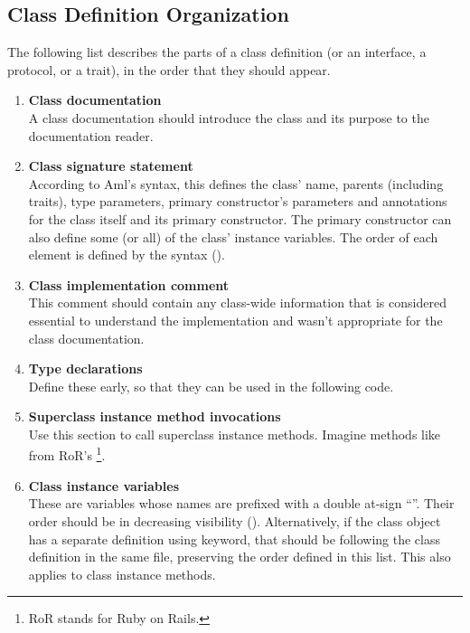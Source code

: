 \subsection{Class Definition Organization}

The following list describes the parts of a class definition (or an interface, a protocol, or a trait), in the order that they should appear. 

\begin{enumerate}
\item {\bfseries Class documentation} \hfill \\
A class documentation should introduce the class and its purpose to the documentation reader. 

\item {\bfseries Class signature statement} \hfill \\
According to Aml's syntax, this defines the class' name, parents (including traits), type parameters, primary constructor's parameters and annotations for the class itself and its primary constructor. The primary constructor can also define some (or all) of the class' instance variables. The order of each element is defined by the syntax (). 

\item {\bfseries Class implementation comment} \hfill \\
This comment should contain any class-wide information that is considered essential to understand the implementation and wasn't appropriate for the class documentation. 

\item {\bfseries Type declarations} \hfill \\
Define these early, so that they can be used in the following code. 

\item {\bfseries Superclass instance method invocations} \hfill \\
Use this section to call superclass instance methods. Imagine methods like  from RoR's \footnote{RoR stands for Ruby on Rails.}. 

\item {\bfseries Class instance variables} \hfill \\
These are variables whose names are prefixed with a double at-sign ``''. Their order should be in decreasing visibility (). Alternatively, if the class object has a separate definition using  keyword, that should be following the class definition in the same file, preserving the order defined in this list. This also applies to class instance methods. 


\end{enumerate}

